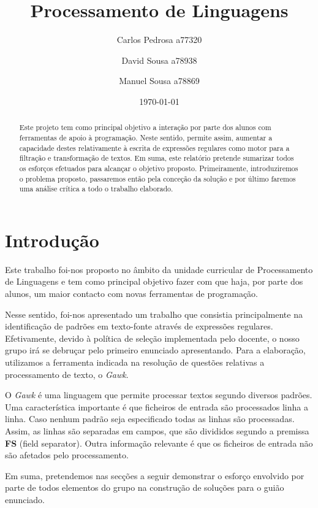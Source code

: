 \documentclass[a4paper]{article}
\title{Processamento de Linguagens\\}
\author{Carlos Pedrosa a77320 \and David Sousa a78938 \and Manuel Sousa a78869}
\date{\today}
\begin{document}
\maketitle

\begin{abstract}
  Este projeto tem como principal objetivo a interação por parte dos alunos com ferramentas de apoio à programação. Neste sentido, permite assim, aumentar a capacidade destes relativamente à escrita de expressões regulares como motor para a filtração e transformação de textos.
  Em suma, este relatório pretende sumarizar todos os esforços efetuados para alcançar o objetivo proposto. Primeiramente, introduziremos o problema proposto, passaremos então pela conceção da solução e por último faremos uma análise crítica a todo o trabalho elaborado.

\end{abstract}



\tableofcontents

\newpage

\section{Introdução}
\label{sec:intro}

Este trabalho foi-nos proposto no âmbito da unidade curricular de Processamento de Linguagens e tem como principal objetivo fazer com que haja, por parte dos alunos, um maior contacto com novas ferramentas de programação. 

Nesse sentido, foi-nos apresentado um trabalho que consistia principalmente na identificação de padrões em texto-fonte através de expressões regulares. Efetivamente, devido à política de seleção implementada pelo docente, o nosso grupo irá se debruçar pelo primeiro enunciado apresentando. Para a elaboração, utilizamos a ferramenta indicada na resolução de questões relativas a processamento de texto, o \textit{Gawk}.

O \textit{Gawk} é uma linguagem que permite processar textos segundo diversos padrões. Uma característica importante é que ficheiros de entrada são processados linha a linha. Caso nenhum padrão seja especificado todas as linhas são processadas. Assim, as linhas são separadas em campos, que são divididos segundo a premissa \textbf{FS} (field separator). Outra informação relevante é que os ficheiros de entrada não são afetados pelo processamento.

Em suma, pretendemos nas secções a seguir demonstrar o esforço envolvido por parte de todos elementos do grupo na construção de soluções para o guião enunciado.
\end{document}
